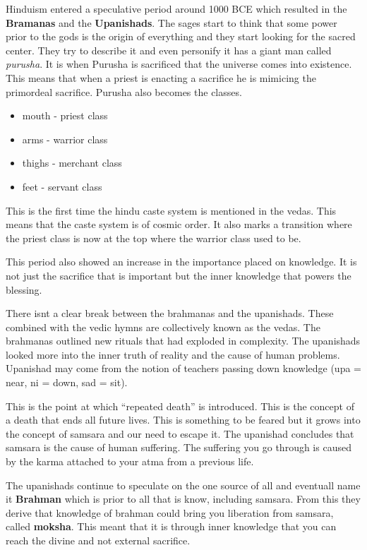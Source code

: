 \documentclass{article}
\begin{document}
Hinduism entered a speculative period around 1000 BCE which resulted in the \textbf{Bramanas} and the \textbf{Upanishads}. The sages start to think that some power prior to the gods is the origin of everything and they start looking for the sacred center. They try to describe it and even personify it has a giant man called \emph{purusha}. It is when Purusha is sacrificed that the universe comes into existence. This means that when a priest is enacting a sacrifice he is mimicing the primordeal sacrifice. Purusha also becomes the classes.
\begin{itemize}
	\item mouth - priest class
	\item arms - warrior class
	\item thighs - merchant class
	\item feet - servant class
\end{itemize}

This is the first time the hindu caste system is mentioned in the vedas. This means that the caste system is of cosmic order. It also marks a transition where the priest class is now at the top where the warrior class used to be.

This period also showed an increase in the importance placed on knowledge. It is not just the sacrifice that is important but the inner knowledge that powers the blessing.

There isnt a clear break between the brahmanas and the upanishads. These combined with the vedic hymns are collectively known as the vedas. The brahmanas outlined new rituals that had exploded in complexity. The upanishads looked more into the inner truth of reality and the cause of human problems. Upanishad may come from the notion of teachers passing down knowledge (upa = near, ni = down, sad = sit).

This is the point at which ``repeated death'' is introduced. This is the concept of a death that ends all future lives. This is something to be feared but it grows into the concept of samsara and our need to escape it. The upanishad concludes that samsara is the cause of human suffering. The suffering you go through is caused by the karma attached to your atma from a previous life.

The upanishads continue to speculate on the one source of all and eventuall name it \textbf{Brahman} which is prior to all that is know, including samsara. From this they derive that knowledge of brahman could bring you liberation from samsara, called \textbf{moksha}. This meant that it is through inner knowledge that you can reach the divine and not external sacrifice.
\end{document}
